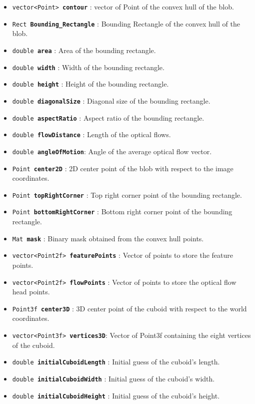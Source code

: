 \documentclass[a4paper]{aitthesis}
\begin{document}
 \begin{itemize}
 
\item \texttt{vector<Point> \textbf{contour}} : vector of Point of the convex hull of the blob.
\item \texttt{Rect \textbf{Bounding\_Rectangle}} : Bounding Rectangle of the convex hull of the blob.
\item \texttt{double \textbf{area}} : Area of the bounding rectangle.
\item \texttt{double \textbf{width}} : Width of the bounding rectangle.
\item \texttt{double \textbf{height}} : Height of the bounding rectangle.
\item \texttt{double \textbf{diagonalSize}} : Diagonal size of the bounding rectangle.
\item \texttt{double \textbf{aspectRatio}} : Aspect ratio of the bounding rectangle.
\item \texttt{double \textbf{flowDistance}} : Length of the optical flows.
\item \texttt{double \textbf{angleOfMotion}}: Angle of the average optical flow vector.
\item \texttt{Point \textbf{center2D}} : 2D center point of the blob with respect to the image coordinates.
\item \texttt{Point \textbf{topRightCorner}} : Top right corner point of the bounding rectangle.
\item \texttt{Point \textbf{bottomRightCorner}} : Bottom right corner point of the bounding rectangle.
\item \texttt{Mat \textbf{mask}} : Binary mask obtained from the convex hull points.
\item \texttt{vector<Point2f> \textbf{featurePoints}} : Vector of points to store the feature points.
\item \texttt{vector<Point2f> \textbf{flowPoints}} : Vector of points to store the optical flow head points.
\item \texttt{Point3f \textbf{center3D}} : 3D center point of the cuboid with respect to the world coordinates.
\item \texttt{vector<Point3f> \textbf{vertices3D}}: Vector of Point3f containing the eight vertices of the cuboid.
\item \texttt{double \textbf{initialCuboidLength}} : Initial guess of the cuboid's length.
\item \texttt{double \textbf{initialCuboidWidth}} : Initial guess of the cuboid's width.
\item \texttt{double \textbf{initialCuboidHeight}} : Initial guess of the cuboid's height.
 \end{itemize}
 
\end{document}
